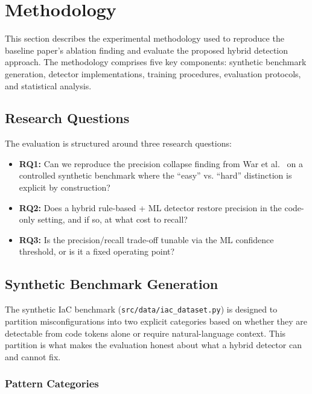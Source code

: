 
\section{Methodology}
\label{sec:Methodology}

This section describes the experimental methodology used to reproduce the baseline paper's ablation finding and evaluate the proposed hybrid detection approach. The methodology comprises five key components: synthetic benchmark generation, detector implementations, training procedures, evaluation protocols, and statistical analysis.

\subsection{Research Questions}

The evaluation is structured around three research questions:

\begin{itemize}
  \item \textbf{RQ1:} Can we reproduce the precision collapse finding from War et al.~\cite{War25} on a controlled synthetic benchmark where the ``easy'' vs. ``hard'' distinction is explicit by construction?
  \item \textbf{RQ2:} Does a hybrid rule-based + ML detector restore precision in the code-only setting, and if so, at what cost to recall?
  \item \textbf{RQ3:} Is the precision/recall trade-off tunable via the ML confidence threshold, or is it a fixed operating point?
\end{itemize}

\subsection{Synthetic Benchmark Generation}

The synthetic IaC benchmark (\texttt{src/data/iac\_dataset.py}) is designed to partition misconfigurations into two explicit categories based on whether they are detectable from code tokens alone or require natural-language context. This partition is what makes the evaluation honest about what a hybrid detector can and cannot fix.

\subsubsection{Pattern Categories}

